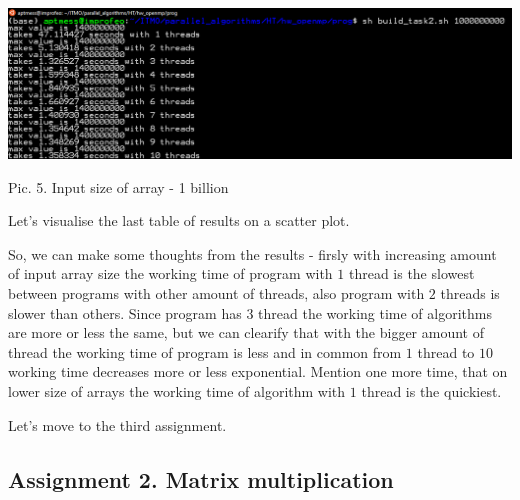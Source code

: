 \documentclass[%
12pt, %
final, %
oneside, %
onecolumn, %
centertags]{article} %
\theoremstyle{plain}
\theoremstyle{definition}
\theoremstyle{remark}
\begin{document}
\begin{center}
\includegraphics[scale=0.55]{t2_billion.png}

Pic. 5. Input size of array - 1 billion
\end{center}

Let's visualise the last table of results on a scatter plot.


\begin{center}
\end{center}

So, we can make some thoughts from the results - firsly with increasing amount of input array size the working time of program with $1$ thread is the slowest between programs with other amount of threads, also program with $2$ threads is slower than others. Since program has $3$ thread the working time of algorithms are more or less the same, but we can clearify that with the bigger amount of thread the working time of program is less and in common from $1$ thread to $10$ working time decreases more or less exponential. Mention one more time, that on lower size of arrays the working time of algorithm with $1$ thread is the quickiest.

Let's move to the third assignment.

\newpage

\subsection{Assignment 2. Matrix multiplication}
\end{document}
